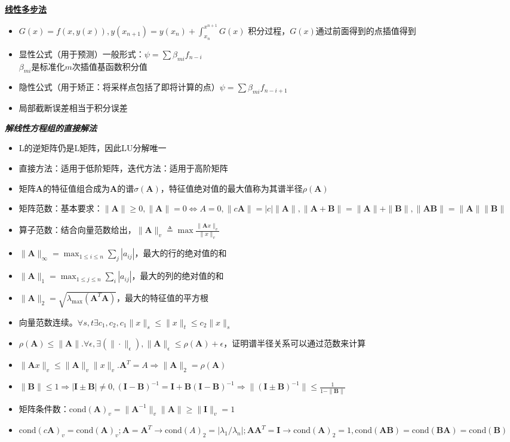 \documentclass[UTF8,a4paper,landscape,8pt]{paper}
\renewcommand{\subsection}[1]{{\small\textbf{\underline{#1}}}\\ }
\renewcommand{\section}[1]{{\normalsize\textbf{\emph{#1}}}\\ }
\newcommand{\List}[1]{\begin{itemize}[fullwidth,itemindent=0em] #1 \end{itemize}}
\begin{document}
\begin{multicols}{4}
    \subsection{线性多步法}
    \List{
        \item{$G(x) = f(x,y(x)),y(x_{n+1}) = y(x_n) + \int_{x_n}^{x^{n+1}} G(x) $ 积分过程，$G(x)$通过前面得到的点插值得到}
        \item {显性公式（用于预测）一般形式：$\psi = \sum\beta_{mi}f_{n-i}$\\ $\beta_{mi}$是标准化$m$次插值基函数积分值}
        \item {隐性公式（用于矫正：将采样点包括了即将计算的点）$\psi = \sum\beta_{mi}f_{n-i+1}$}
        \item {局部截断误差相当于积分误差}
    }
\section{解线性方程组的直接解法}
    \List{
        \item {L的逆矩阵仍是L矩阵，因此LU分解唯一}
		\item {直接方法：适用于低阶矩阵，迭代方法：适用于高阶矩阵}
        \item {矩阵$\bm{A}$的特征值组合成为$\bm{A}$的谱$\sigma(\bm{A})$，特征值绝对值的最大值称为其谱半径$\rho(\bm{A})$}
        \item {矩阵范数：基本要求：$\|\bm A\|\ge 0,\|\bm A\| = 0 \iff A = 0,\|c\bm A\| = |c|\|\bm A\|, \|\bm A + \bm B \| = \|\bm A\| + \| \bm B\|, \|\bm A\bm B\| = \|\bm A\|\|\bm B\|$}
        \item {算子范数：结合向量范数给出，$\|\bm A\|_v \triangleq \max \frac {\|\bm A x\|_v}{\|x\|_v}$}
        \item {$\|\bm A\|_\infty= \max_{1\le i \le n}\sum_j|a_{ij}|$，最大的行的绝对值的和}
        \item {$\|\bm A\|_1= \max_{1\le j \le n}\sum_i|a_{ij}|$，最大的列的绝对值的和}
        \item {$\|\bm A\|_2= \sqrt{\lambda_{\max}(\bm A^T\bm A)}$，最大的特征值的平方根}
        \item {向量范数连续。$\forall s,t \exists c_1,c_2, c_1\|x\|_s \le \|x\|_t \le c_2\|x\|_s$}
        \item {$\rho(\bm A) \le \|\bm A\|. \forall \epsilon, \exists (\|\cdot\|_{\epsilon}), \|\bm A\|_{\epsilon} \le \rho(\bm A) + \epsilon$，证明谱半径关系可以通过范数来计算}
        \item {$\|\bm Ax\|_v \le \|\bm A\|_v\|x\|_v.\bm A^T = A\Rightarrow \|\bm A\|_2 = \rho(\bm A)$}
        \item {$\|\bm B\| \le 1 \Rightarrow |\bm I\pm \bm B| \ne 0, (\bm I - \bm B)^{-1} = \bm I + \bm B(\bm I - \bm B)^{-1} \Rightarrow \|(\bm I \pm \bm B)^{-1}\| \le \frac 1{1-\|\bm B\|}$}
        \item {矩阵条件数：$\mathrm{cond}(\bm A)_v = \|\bm A^{-1}\|_v\|\bm A\| \ge \|\bm I\|_v = 1$}
        \item {$\mathrm{cond}(c\bm A)_v = \mathrm{cond}(\bm A)_v; \bm A = \bm A^T \rightarrow \mathrm{cond}(A)_2=|\lambda_1/\lambda_n|;\bm A\bm A^T = \bm I \rightarrow \mathrm{cond}(\bm A)_2 = 1,\mathrm{cond}(\bm A \bm B)=\mathrm{cond}(\bm B \bm A) = \mathrm{cond}(\bm B) $}
    }

\end{multicols}
\end{document}
